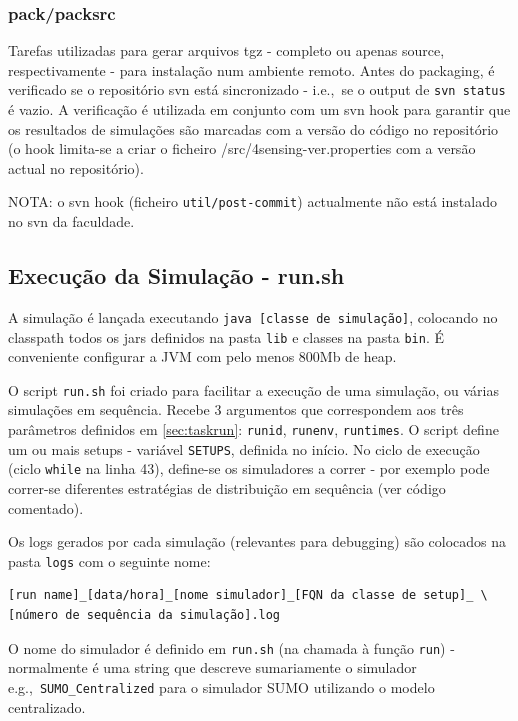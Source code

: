 \documentclass{article}
\newcommand{\ie}{i.e.,\ }
\newcommand{\eg}{e.g.,\ }
\newcommand{\tm}[1]{\texttt{#1}}
\begin{document}
\subsubsection{pack/packsrc}
Tarefas utilizadas para gerar arquivos tgz - completo ou apenas source, respectivamente - para instalação num ambiente remoto. 
Antes do packaging, é verificado se o repositório svn está sincronizado - \ie se o output de \tm{svn status} é vazio. A verificação é utilizada em conjunto com um svn hook para garantir que os resultados de simulações são marcadas com a versão do código no repositório (o hook limita-se a criar o ficheiro /src/4sensing-ver.properties com a versão actual no repositório).

NOTA: o svn hook (ficheiro \tm{util/post-commit}) actualmente não está instalado no svn da faculdade.

\subsection{Execução da Simulação - run.sh}\label{sec:runsh}

A simulação é lançada executando \tm{java [classe de simulação]}, colocando no classpath todos os jars definidos na pasta \tm{lib} e classes na pasta \tm{bin}. É conveniente configurar a JVM com pelo menos 800Mb de heap.

O script \tm{run.sh} foi criado para facilitar a execução de uma simulação, ou várias simulações em sequência. Recebe 3 argumentos que correspondem aos três parâmetros definidos em \ref{sec:taskrun}:  \tm{runid}, \tm{runenv}, \tm{runtimes}. O script define um ou mais setups - variável \tm{SETUPS}, definida no início. No ciclo de execução (ciclo \tm{while} na linha 43), define-se os simuladores a correr - por exemplo pode correr-se diferentes estratégias de distribuição em sequência (ver código comentado).

Os logs gerados por cada simulação (relevantes para debugging) são colocados na pasta \tm{logs} com o seguinte nome:

\begin{Verbatim}
[run name]_[data/hora]_[nome simulador]_[FQN da classe de setup]_ \
[número de sequência da simulação].log
\end{Verbatim}

O nome do simulador é definido em \tm{run.sh} (na chamada à função \tm{run}) - normalmente é uma string que descreve sumariamente o simulador \eg \tm{SUMO\_Centralized} para o simulador SUMO utilizando o modelo centralizado.
\end{document}
